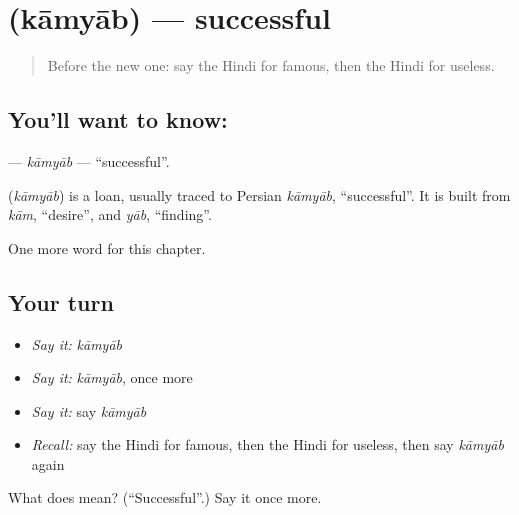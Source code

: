 \section[\texorpdfstring{\hi{कामयाब} (kāmyāb)}{कामयाब (kāmyāb)}]{ (kāmyāb) — successful}

\label{lesson:HI-C242-kamyab}



\begin{quote}
Before the new one: say the Hindi for famous, then the Hindi for useless.
\end{quote}

\subsection*{You'll want to know: }
\textbf{} — \emph{kāmyāb} — \textquotedblleft{}successful\textquotedblright{}.

\begin{cousinweb}
\textbf{} (\emph{kāmyāb}) is a loan, usually traced to Persian \emph{kāmyāb}, \textquotedblleft{}successful\textquotedblright{}. It is built from \emph{kām}, \textquotedblleft{}desire\textquotedblright{}, and \emph{yāb}, \textquotedblleft{}finding\textquotedblright{}.
\end{cousinweb}

\begin{grammarlens}[title={What you've built}]
One more word for this chapter.
\end{grammarlens}

\subsection*{Your turn}
\begin{itemize}
\raggedright
  \item \emph{Say it:} \emph{kāmyāb}
  \item \emph{Say it:} \emph{kāmyāb}, once more
  \item \emph{Say it:} say \emph{kāmyāb}
  \item \emph{Recall:} say the Hindi for famous, then the Hindi for useless, then say \emph{kāmyāb} again
\end{itemize}

\begin{tcolorbox}[breakable,colback=teal!4,colframe=teal!35!black,title={Before you move on}]
What does  mean? (\textquotedblleft{}Successful\textquotedblright{}.) Say it once more.
\end{tcolorbox}
